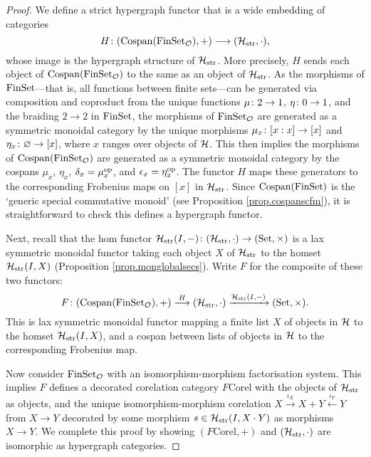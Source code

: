 \begin{proof}
  We define a strict hypergraph functor that is a wide embedding of categories
  \[
    H{\colon} (\operatorname{{Cospan}}(\mathrm{FinSet}_{\mathcal O}),+) \longrightarrow (\mathcal
    H_{\mathrm{str}},\cdot),
  \]
  whose image is the hypergraph structure of $\mathcal H_{\mathrm{str}}$. More
  precisely, $H$ sends each object of $\operatorname{{Cospan}}(\mathrm{FinSet}_{\mathcal O})$ to the same as
  an object of $\mathcal H_{\mathrm{str}}$.  As the morphisms of $\mathrm{FinSet}$---that is,
  all functions between finite sets---can be generated via composition and
  coproduct from the unique functions $\mu {\colon} 2 \to 1$, $\eta {\colon} 0 \to 1$,
  and the braiding $2 \to 2$ in $\mathrm{FinSet}$, the morphisms of $\mathrm{FinSet}_{\mathcal O}$
  are generated as a symmetric monoidal category by the unique morphisms
  $\mu_x{\colon} [x:x]\to [x]$ and $\eta_x{\colon} \varnothing \to [x]$, where $x$
  ranges over objects of $\mathcal H$.  This then implies the morphisms of
  $\operatorname{{Cospan}}(\mathrm{FinSet}_{\mathcal O})$ are generated as a symmetric monoidal category by
  the cospans $\mu_x$, $\eta_x$, $\delta_x = \mu_x^{\mathrm{op}}$, and $\epsilon_x =
  \eta_x^{\mathrm{op}}$. The functor $H$ maps these generators to the corresponding
  Frobenius maps on $[x]$ in $\mathcal H_{\mathrm{str}}$. Since $\operatorname{{Cospan}}(\mathrm{FinSet})$ is
  the `generic special commutative monoid' (see Proposition
  \ref{prop.cospanscfm}), it is straightforward to check this defines a
  hypergraph functor.

  Next, recall that the hom functor $\mathcal H_{\mathrm{str}}(I,-){\colon} (\mathcal
  H_{\mathrm{str}},\cdot) \to (\mathrm{Set},\times)$ is a lax symmetric monoidal functor taking each
  object $X$ of $\mathcal H_{\mathrm{str}}$ to the homset $\mathcal H_{\mathrm{str}}(I,X)$
  (Proposition \ref{prop.monglobalsecs}). Write $F$ for the composite of these
  two functors: 
  \[
    F{\colon} (\operatorname{{Cospan}}(\mathrm{FinSet}_{\mathcal O}),+) \stackrel{H}\longrightarrow (\mathcal
    H_{\mathrm{str}},\cdot) \xrightarrow{\mathcal H_{\mathrm{str}}(I,-)}
    (\mathrm{Set},\times).
  \]
  This is lax symmetric monoidal functor mapping a finite list $X$ of objects in
  $\mathcal H$ to the homset $\mathcal H_{\mathrm{str}}(I,X)$, and a cospan between lists
  of objects in $\mathcal H$ to the corresponding Frobenius map.

  Now consider $\mathrm{FinSet}_{\mathcal O}$ with an isomorphism-morphism factorisation
  system. This implies $F$ defines a decorated corelation category
  $F\mathrm{Corel}$ with the objects of $\mathcal H_{\mathrm{str}}$ as objects, and
  the unique isomorphism-morphism corelation $X \xrightarrow{\iota_X} X+Y
  \xleftarrow{\iota_Y} Y$ from $X \to Y$ decorated by some morphism $s \in \mathcal
  H_{\mathrm{str}}(I,X\cdot Y)$ as morphisms $X \to Y$. We complete this proof
  by showing $(F\mathrm{Corel},+)$ and $(\mathcal H_{\mathrm{str}},\cdot)$ are
  isomorphic as hypergraph categories.
  

\end{proof}
